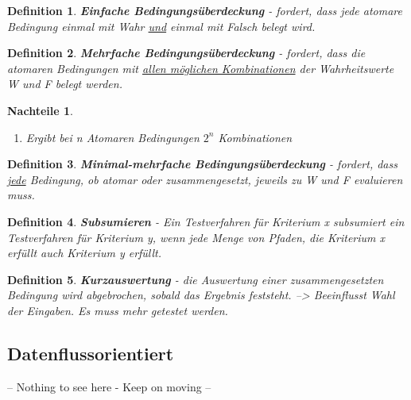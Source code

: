 \documentclass[a4paper]{article}
\theoremstyle{break}
\newtheorem{defi}{Definition}[section]
\newtheorem{whynot}{Nachteile}[section]
\begin{document}
        \begin{defi}
          \textbf{Einfache Bedingungsüberdeckung} - fordert, dass jede atomare Bedingung einmal mit Wahr \ul{und} einmal mit Falsch belegt wird.
        \end{defi}

        \begin{defi}
          \textbf{Mehrfache Bedingungsüberdeckung} - fordert, dass die atomaren Bedingungen mit \ul{allen m\"oglichen Kombinationen} der Wahrheitswerte W und F belegt werden.
        \end{defi}

        \begin{whynot}
          \begin{enumerate}
          \item Ergibt bei n Atomaren Bedingungen \(2^n\) Kombinationen
          \end{enumerate}
        \end{whynot}

        \begin{defi}
          \textbf{Minimal-mehrfache Bedingungsüberdeckung} - fordert, dass \ul{jede} Bedingung, ob atomar oder zusammengesetzt, jeweils zu W und F evaluieren muss.
        \end{defi}

        \begin{defi}
          \textbf{Subsumieren} - Ein Testverfahren für Kriterium x subsumiert ein Testverfahren für Kriterium y, wenn jede Menge von Pfaden, die Kriterium x erfüllt auch Kriterium y erfüllt.
        \end{defi}

        
        \begin{defi}
          \textbf{Kurzauswertung} - die Auswertung einer zusammengesetzten Bedingung wird abgebrochen, sobald das Ergebnis feststeht.
          --> Beeinflusst Wahl der Eingaben. Es muss mehr getestet werden.
        \end{defi}
        
        \subsection{Datenflussorientiert}
        -- Nothing to see here - Keep on moving --
\end{document}
